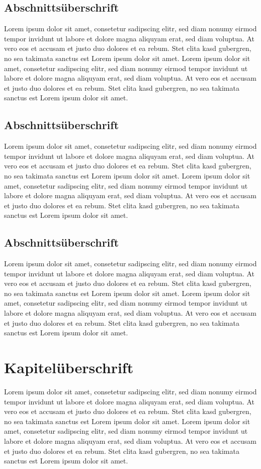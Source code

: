 \documentclass[12pt,oneside,a4paper,bibtotoc,liststotoc,pointlessnumbers]{scrartcl}
\begin{document}
\subsection{Abschnittsüberschrift}
Lorem ipsum dolor sit amet, consetetur sadipscing elitr, sed diam nonumy eirmod tempor invidunt ut labore et dolore magna aliquyam erat, sed diam voluptua. At vero eos et accusam et justo duo dolores et ea rebum. Stet clita kasd gubergren, no sea takimata sanctus est Lorem ipsum dolor sit amet. Lorem ipsum dolor sit amet, consetetur sadipscing elitr, sed diam nonumy eirmod tempor invidunt ut labore et dolore magna aliquyam erat, sed diam voluptua. At vero eos et accusam et justo duo dolores et ea rebum. Stet clita kasd gubergren, no sea takimata sanctus est Lorem ipsum dolor sit amet.
\subsection{Abschnittsüberschrift}
Lorem ipsum dolor sit amet, consetetur sadipscing elitr, sed diam nonumy eirmod tempor invidunt ut labore et dolore magna aliquyam erat, sed diam voluptua. At vero eos et accusam et justo duo dolores et ea rebum. Stet clita kasd gubergren, no sea takimata sanctus est Lorem ipsum dolor sit amet. Lorem ipsum dolor sit amet, consetetur sadipscing elitr, sed diam nonumy eirmod tempor invidunt ut labore et dolore magna aliquyam erat, sed diam voluptua. At vero eos et accusam et justo duo dolores et ea rebum. Stet clita kasd gubergren, no sea takimata sanctus est Lorem ipsum dolor sit amet.
\subsection{Abschnittsüberschrift}
Lorem ipsum dolor sit amet, consetetur sadipscing elitr, sed diam nonumy eirmod tempor invidunt ut labore et dolore magna aliquyam erat, sed diam voluptua. At vero eos et accusam et justo duo dolores et ea rebum. Stet clita kasd gubergren, no sea takimata sanctus est Lorem ipsum dolor sit amet. Lorem ipsum dolor sit amet, consetetur sadipscing elitr, sed diam nonumy eirmod tempor invidunt ut labore et dolore magna aliquyam erat, sed diam voluptua. At vero eos et accusam et justo duo dolores et ea rebum. Stet clita kasd gubergren, no sea takimata sanctus est Lorem ipsum dolor sit amet.

\section{Kapitelüberschrift}
Lorem ipsum dolor sit amet, consetetur sadipscing elitr, sed diam nonumy eirmod tempor invidunt ut labore et dolore magna aliquyam erat, sed diam voluptua. At vero eos et accusam et justo duo dolores et ea rebum. Stet clita kasd gubergren, no sea takimata sanctus est Lorem ipsum dolor sit amet. Lorem ipsum dolor sit amet, consetetur sadipscing elitr, sed diam nonumy eirmod tempor invidunt ut labore et dolore magna aliquyam erat, sed diam voluptua. At vero eos et accusam et justo duo dolores et ea rebum. Stet clita kasd gubergren, no sea takimata sanctus est Lorem ipsum dolor sit amet.
\end{document}
